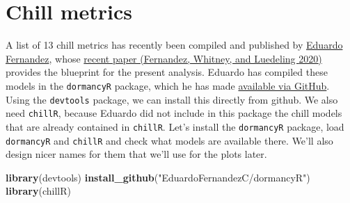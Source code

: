 \documentclass[
]{book}
\newenvironment{Shaded}{\begin{snugshade}}{\end{snugshade}}
\newcommand{\KeywordTok}[1]{\textcolor[rgb]{0.13,0.29,0.53}{\textbf{#1}}}
\newcommand{\NormalTok}[1]{#1}
\newcommand{\StringTok}[1]{\textcolor[rgb]{0.31,0.60,0.02}{#1}}
\begin{document}
\hypertarget{chill-metrics}{%
\section{Chill metrics}\label{chill-metrics}}

A list of 13 chill metrics has recently been compiled and published by \href{https://scholar.google.de/citations?hl=de\&user=ibSma_AAAAAJ}{Eduardo Fernandez}, whose \href{https://www.sciencedirect.com/science/article/abs/pii/S1161030120301106}{recent paper (Fernandez, Whitney, and Luedeling \protect\hyperlink{ref-fernandez2020importance}{2020})} provides the blueprint for the present analysis. Eduardo has compiled these models in the \texttt{dormancyR} package, which he has made \href{https://github.com/EduardoFernandezC/dormancyR}{available via GitHub}. Using the \texttt{devtools} package, we can install this directly from github. We also need \texttt{chillR}, because Eduardo did not include in this package the chill models that are already contained in \texttt{chillR}.
Let's install the \texttt{dormancyR} package, load \texttt{dormancyR} and \texttt{chillR} and check what models are available there. We'll also design nicer names for them that we'll use for the plots later.

\begin{Shaded}
\begin{Highlighting}[]
\KeywordTok{library}\NormalTok{(devtools)}
\KeywordTok{install_github}\NormalTok{(}\StringTok{"EduardoFernandezC/dormancyR"}\NormalTok{)}
\KeywordTok{library}\NormalTok{(chillR)}
\end{Highlighting}
\end{Shaded}
\end{document}
